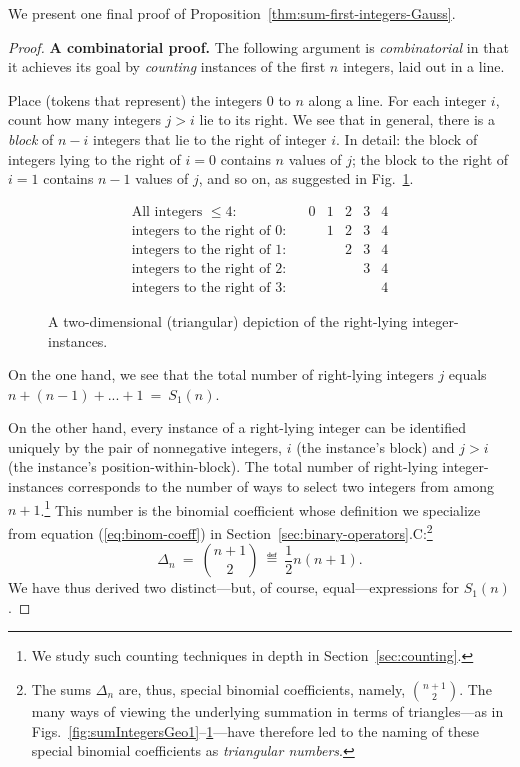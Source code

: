 \medskip

We present one final proof of
Proposition~\ref{thm:sum-first-integers-Gauss}.

\begin{proof}
{\bf A combinatorial proof.}
%
The following argument is {\it combinatorial} in that it achieves its
goal by {\em counting} instances of the first $n$ integers, laid out
in a line.

Place (tokens that represent) the integers $0$ to $n$ along a line.
For each integer $i$, count how many integers $j > i$ lie to its
right.  We see that in general, there is a {\it block} of $n-i$
integers that lie to the right of integer $i$.  In detail: the block
of integers lying to the right of $i=0$ contains $n$ values of $j$;
the block to the right of $i=1$ contains $n-1$ values of $j$, and so
on, as suggested in Fig.~\ref{fig:rightward-instances}.

\begin{figure}[htb]
\[
\begin{array}{lcccccc}
\mbox{All integers $\leq 4$:} &
 & 0 & 1 & 2 & 3 & 4 \\
\mbox{integers to the right of $0$:} &
 &   & 1 & 2 & 3 & 4 \\
\mbox{integers to the right of $1$:} &
 &   &   & 2 & 3 & 4 \\
\mbox{integers to the right of $2$:} &
 &   &   &   & 3 & 4 \\
\mbox{integers to the right of $3$:} &
 &   &   &   &   & 4
\end{array}
\]
\caption{A two-dimensional (triangular) depiction of the right-lying
  integer-instances.}
\label{fig:rightward-instances}
\end{figure}

On the one hand, we see that the total number of right-lying integers
$j$ equals $n+(n-1)+ ... + 1 \ = \ S_1(n)$.

On the other hand, every instance of a right-lying integer can be
identified uniquely by the pair of nonnegative integers, $i$ (the
instance's block) and $j>i$ (the instance's position-within-block).
The total number of right-lying integer-instances corresponds to the
number of ways to select two integers from among $n+1$.\footnote{We
  study such counting techniques in depth in
  Section~\ref{sec:counting}.}  This number is the binomial
coefficient whose definition we specialize from equation
(\ref{eq:binom-coeff}) in
Section~\ref{sec:binary-operators}.C:\footnote{The sums $\Delta_n$
  are, thus, special binomial coefficients, namely, $\displaystyle
  {{n+1} \choose 2}$.  The many ways of viewing the underlying
  summation in terms of triangles---as in
  Figs.~\ref{fig:sumIntegersGeo1}--\ref{fig:rightward-instances}---have
  therefore led to the naming of these special binomial coefficients
  as {\it triangular numbers}.  
   }
\[ 
\Delta_n \ = \ {{n+1} \choose 2} \ \eqdef \ \frac{1}{2} n(n+1).
\]
We have thus derived two distinct---but, of course,
equal---expressions for $S_1(n)$.
\end{proof}
\medskip


